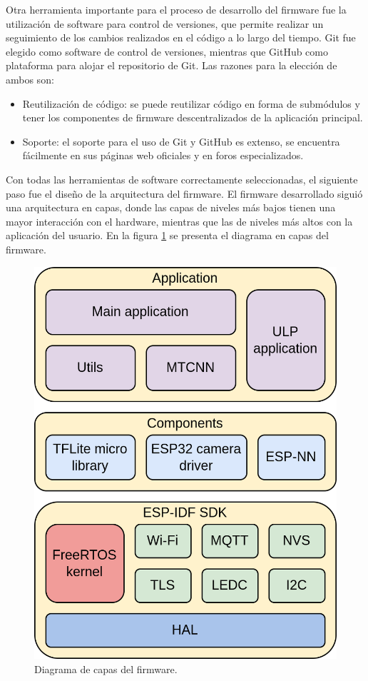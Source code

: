 Otra herramienta importante para el proceso de desarrollo del firmware fue la utilización de software para control de versiones, que permite realizar un seguimiento de los cambios realizados en el código a lo largo del tiempo. Git fue elegido como software de control de versiones, mientras que GitHub como plataforma para alojar el repositorio de Git. Las razones para la elección de ambos son:
\begin{itemize}
	\item Reutilización de código: se puede reutilizar código en forma de submódulos y tener los componentes de firmware descentralizados de la aplicación principal.
	\item Soporte: el soporte para el uso de Git y GitHub es extenso, se encuentra fácilmente en sus páginas web oficiales y en foros especializados.
\end{itemize}

Con todas las herramientas de software correctamente seleccionadas, el siguiente paso fue el diseño de la arquitectura del firmware. El firmware desarrollado siguió una arquitectura en capas, donde las capas de niveles más bajos tienen una mayor interacción con el hardware, mientras que las de niveles más altos con la aplicación del usuario. En la figura \ref{fig:fw_layers} se presenta el diagrama en capas del firmware.

\begin{figure}[h]
	\centering
	\includegraphics[scale=0.22]{./Figures/fw_layers.png}
	\caption{Diagrama de capas del firmware.}
	\label{fig:fw_layers}
\end{figure}

